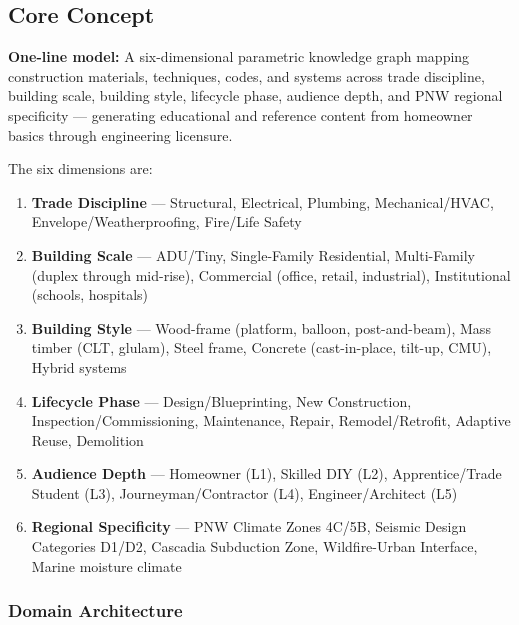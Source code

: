 \documentclass[11pt,letterpaper]{article}
\begin{document}
\subsection{Core Concept}

\begin{quotebox}
\textbf{One-line model:} A six-dimensional parametric knowledge graph mapping construction materials, techniques, codes, and systems across trade discipline, building scale, building style, lifecycle phase, audience depth, and PNW regional specificity --- generating educational and reference content from homeowner basics through engineering licensure.
\end{quotebox}

The six dimensions are:

\begin{enumerate}[leftmargin=2em]
\item \textbf{Trade Discipline} --- Structural, Electrical, Plumbing, Mechanical/HVAC, Envelope/Weatherproofing, Fire/Life Safety
\item \textbf{Building Scale} --- ADU/Tiny, Single-Family Residential, Multi-Family (duplex through mid-rise), Commercial (office, retail, industrial), Institutional (schools, hospitals)
\item \textbf{Building Style} --- Wood-frame (platform, balloon, post-and-beam), Mass timber (CLT, glulam), Steel frame, Concrete (cast-in-place, tilt-up, CMU), Hybrid systems
\item \textbf{Lifecycle Phase} --- Design/Blueprinting, New Construction, Inspection/Commissioning, Maintenance, Repair, Remodel/Retrofit, Adaptive Reuse, Demolition
\item \textbf{Audience Depth} --- Homeowner (L1), Skilled DIY (L2), Apprentice/Trade Student (L3), Journeyman/Contractor (L4), Engineer/Architect (L5)
\item \textbf{Regional Specificity} --- PNW Climate Zones 4C/5B, Seismic Design Categories D1/D2, Cascadia Subduction Zone, Wildfire-Urban Interface, Marine moisture climate
\end{enumerate}

\subsubsection{Domain Architecture}
\end{document}
